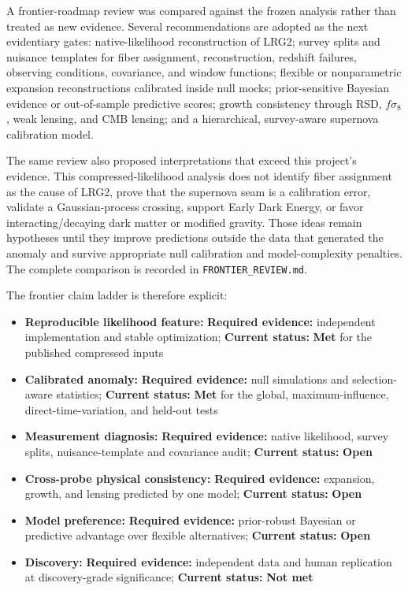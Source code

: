 \documentclass[aps,prd,preprint,superscriptaddress,nofootinbib]{revtex4-2}
\providecommand{\tightlist}{\setlength{\itemsep}{0pt}\setlength{\parskip}{0pt}}
\begin{document}
A frontier-roadmap review was compared against the frozen analysis
rather than treated as new evidence. Several recommendations are adopted
as the next evidentiary gates: native-likelihood reconstruction of LRG2;
survey splits and nuisance templates for fiber assignment,
reconstruction, redshift failures, observing conditions, covariance, and
window functions; flexible or nonparametric expansion reconstructions
calibrated inside null mocks; prior-sensitive Bayesian evidence or
out-of-sample predictive scores; growth consistency through RSD,
\(f\sigma_8\), weak lensing, and CMB lensing; and a hierarchical,
survey-aware supernova calibration model.

The same review also proposed interpretations that exceed this project's
evidence. This compressed-likelihood analysis does not identify fiber
assignment as the cause of LRG2, prove that the supernova seam is a
calibration error, validate a Gaussian-process crossing, support Early
Dark Energy, or favor interacting/decaying dark matter or modified
gravity. Those ideas remain hypotheses until they improve predictions
outside the data that generated the anomaly and survive appropriate null
calibration and model-complexity penalties. The complete comparison is
recorded in \texttt{FRONTIER\_REVIEW.md}.

The frontier claim ladder is therefore explicit:

\begin{itemize}
\tightlist
\item
  \textbf{Reproducible likelihood feature:} \textbf{Required evidence:}
  independent implementation and stable optimization; \textbf{Current
  status:} \textbf{Met} for the published compressed inputs
\item
  \textbf{Calibrated anomaly:} \textbf{Required evidence:} null
  simulations and selection-aware statistics; \textbf{Current status:}
  \textbf{Met} for the global, maximum-influence, direct-time-variation,
  and held-out tests
\item
  \textbf{Measurement diagnosis:} \textbf{Required evidence:} native
  likelihood, survey splits, nuisance-template and covariance audit;
  \textbf{Current status:} \textbf{Open}
\item
  \textbf{Cross-probe physical consistency:} \textbf{Required evidence:}
  expansion, growth, and lensing predicted by one model; \textbf{Current
  status:} \textbf{Open}
\item
  \textbf{Model preference:} \textbf{Required evidence:} prior-robust
  Bayesian or predictive advantage over flexible alternatives;
  \textbf{Current status:} \textbf{Open}
\item
  \textbf{Discovery:} \textbf{Required evidence:} independent data and
  human replication at discovery-grade significance; \textbf{Current
  status:} \textbf{Not met}
\end{itemize}
\end{document}

